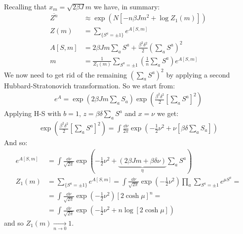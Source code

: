 \documentclass[../template.tex]{subfiles}
\begin{document}
Recalling that $x_m = \sqrt{2 \beta J}m$ we have, in summary:
\begin{align*}
    \overline{Z^n} &\approx \exp\left(N [-n \beta J m^2 + \log Z_1(m)]\right)\\
    Z(m) &= \sum_{\{S^a = \pm 1\}} e^{A[S,m]}\\
    A[S,m] &= 2 \beta J m \sum_a S^a + \frac{\beta^2 \delta^2}{2} \left(\sum_a S^a\right)^2 \\
    m &= \frac{1}{Z_1(m)} \sum_{S^a = \pm 1} \left(\frac{1}{n} \sum_a S^a \right) e^{A[S,m]}  
\end{align*} 
We now need to get rid of the remaining $(\sum_a S^a)^2$ by applying a second Hubbard-Stratonovich transformation. So we start from:
\begin{align*}
    e^A = \exp\left(2 \beta Jm \sum_a S_a\right) \exp\left(\frac{\beta^2 \delta^2}{2} \left[\sum_a S^a\right]^2 \right)
\end{align*}
Applying H-S with $b=1$, $z = \beta \delta \sum_a S^a$ and $x = \nu$ we get:
\begin{align*}
    \exp\left(\frac{\beta^2 \delta^2}{2} \left[\sum_a S^a\right]^2 \right) = \int \frac{\dd{\nu}}{2 \pi} \exp\left(-\frac{1}{2} \nu^2 + \nu \left[\beta \delta \sum_a S_a\right] \right)
\end{align*}   
And so:
\begin{align*}
    e^{A[S,m]} &= \int \frac{\dd{\nu}}{\sqrt{2 \pi}} \exp\left(-\frac{1}{2} \nu^2 + \underbrace{(2 \beta J m + \beta \delta \nu)}_{\eta} \sum_a S^a  \right)\\
    Z_1(m) &= \sum_{\{S^a = \pm 1\}} e^{A[S,m]} = \int \frac{\dd{\nu}}{\sqrt{2 \pi}} \exp\left(-\frac{1}{2} \nu^2 \right) \prod_a \sum_{S^a = \pm 1} e^{\mu S^a} =\\
    &= \int \frac{\dd{\nu}}{\sqrt{2 \pi}} \exp\left(-\frac{1}{2} \nu^2 \right) [2 \cosh \mu]^n = \\
    &= \int \frac{\dd{\nu}}{\sqrt{2\pi}} \exp\left(-\frac{1}{2} \nu^2 + n \log [2 \cosh \mu] \right) 
\end{align*} 
and so $Z_1 (m)  \xrightarrow[n \to 0]{}  1$. 
\end{document}
